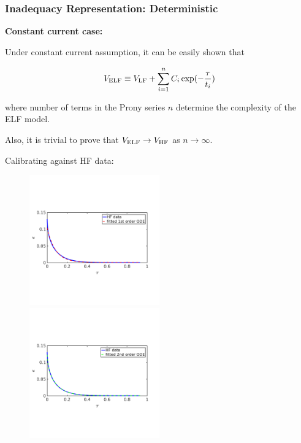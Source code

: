 \documentclass[10pt,xcolor=dvipsnames,compress]{beamer}
\begin{document}
\begin{frame}
\frametitle{Inadequacy Representation: Deterministic}
\vfill


\textbf{Constant current case:}

Under constant current assumption, it can be easily shown that

\begin{equation*}
V_{\rm ELF}  \equiv V_{\rm LF} + \sum_{i = 1}^n C_i \exp(-\frac{\tau}{t_i})
\end{equation*}

where number of terms in the Prony series $n$ determine the complexity of the ELF model.

Also, it is trivial
 to prove that $V_{\rm ELF} \rightarrow V_{\rm HF}$ as $n \rightarrow \infty$.

\vspace{0.1in}
Calibrating against HF data:
\vspace{-0.1in}
\begin{figure}
\includegraphics[trim = 0.in 2.4in 0.in 2.8in, clip, width=0.5\textwidth]{figs/Iconst_eps_modelfit_1st.png}
~
\includegraphics[trim = 0.in 2.4in 0.in 2.8in, clip, width=0.5\textwidth]{figs/Iconst_eps_modelfit_2nd.png}
\end{figure}


\vfill
\end{frame}
\end{document}
